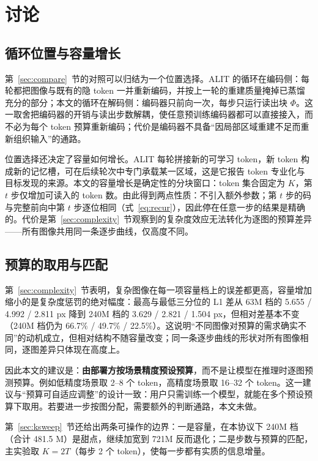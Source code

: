 \section{\heiti 讨论}
\label{sec:discussion}

\subsection{\heiti 循环位置与容量增长}
\label{sec:loop-side}

第~\ref{sec:compare}~节的对照可以归结为一个位置选择。ALIT 的循环在编码侧：每轮都把图像与既有的隐 token 一并重新编码，并按上一轮的重建质量掩掉已蒸馏充分的部分；本文的循环在解码侧：编码器只前向一次，每步只运行读出块 $\Phi$。这一取舍把编码器的开销与读出步数解耦，使任意预训练编码器都可以直接接入，而不必为每个 token 预算重新编码；代价是编码器不具备“因局部区域重建不足而重新组织输入”的通路。

位置选择还决定了容量如何增长。ALIT 每轮拼接新的可学习 token，新 token 构成新的记忆槽，可在后续轮次中专门承载某一区域，这是它报告 token 专业化与目标发现的来源。本文的容量增长是确定性的分块窗口：token 集合固定为 $K$，第 $t$ 步仅增加可读入的 token 数。由此得到两点性质：不引入额外参数；第 $t$ 步的码与完整前向中第 $t$ 步逐位相同（式~\eqref{eq:recur}），因此停在任意一步的结果是精确的。代价是第~\ref{sec:complexity}~节观察到的复杂度效应无法转化为逐图的预算差异——所有图像共用同一条逐步曲线，仅高度不同。

\subsection{\heiti 预算的取用与匹配}
\label{sec:deploy}

第~\ref{sec:complexity}~节表明，复杂图像在每一项容量档上的误差都更高，容量增加缩小的是复杂度惩罚的绝对幅度：最高与最低三分位的 L1 差从 63M 档的 5.655 / 4.992 / 2.811 px 降到 240M 档的 3.629 / 2.821 / 1.504 px，但相对差基本不变（240M 档仍为 66.7\% / 49.7\% / 22.5\%）。这说明“不同图像对预算的需求确实不同”的动机成立，但相对结构不随容量改变；同一条逐步曲线的形状对所有图像相同，逐图差异只体现在高度上。

因此本文的建议是：\textbf{由部署方按场景精度预设预算}，而不是让模型在推理时逐图预测预算。例如低精度场景取 2--8 个 token，高精度场景取 16--32 个 token。这一建议与“预算可自适应调整”的设计一致：用户只需训练一个模型，就能在多个预设预算下取用。若要进一步按图分配，需要额外的判断通路，本文未做。

第~\ref{sec:ksweep}~节还给出两条可操作的边界：一是容量，在本协议下 240M 档（合计 481.5 M）是甜点，继续加宽到 721M 反而退化；二是步数与预算的匹配，主实验取 $K=2T$（每步 2 个 token），使每一步都有实质的信息增量。

